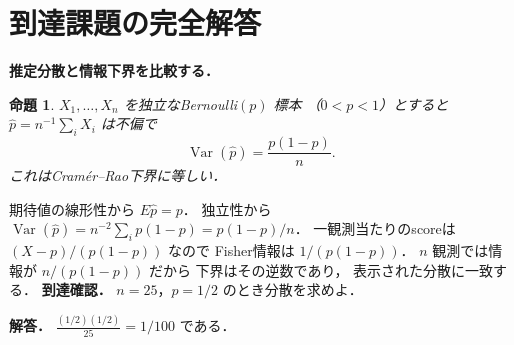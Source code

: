 \documentclass[a5paper,10pt,onecolumn]{jsarticle}
\makeatletter
\theoremstyle{mathnotetheorem}
\newtheorem{proposition}[theorem]{命題}
\renewcommand{\proofname}{証明}
\renewenvironment{proof}[1][\proofname]{%
  \par\pushQED{\qed}\normalfont\topsep4\p@\@plus2\p@\relax
  \trivlist\item[\hskip\labelsep\bfseries #1]\ignorespaces
}{\popQED\endtrivlist\@endpefalse}
\makeatother
\begin{document}
\section{到達課題の完全解答}
\noindent\textbf{推定分散と情報下界を比較する．}
\begin{proposition}
$X_1,\dots,X_n$ を独立なBernoulli$(p)$ 標本
（$0<p<1$）とすると
$\widehat p=n^{-1}\sum_iX_i$ は不偏で
\[
\operatorname{Var}(\widehat p)=\frac{p(1-p)}n.
\]
これはCramér--Rao下界に等しい．
\end{proposition}
\begin{proof}
期待値の線形性から $E\widehat p=p$．
独立性から
$\operatorname{Var}(\widehat p)
=n^{-2}\sum_i p(1-p)=p(1-p)/n$．
一観測当たりのscoreは
$(X-p)/(p(1-p))$ なので
Fisher情報は $1/(p(1-p))$．
$n$ 観測では情報が $n/(p(1-p))$ だから
下界はその逆数であり，
表示された分散に一致する．
\end{proof}
\noindent\textbf{到達確認．}
$n=25$，$p=1/2$ のとき分散を求めよ．
\par\noindent\textbf{解答．}
$\frac{(1/2)(1/2)}{25}=1/100$ である．
\end{document}
